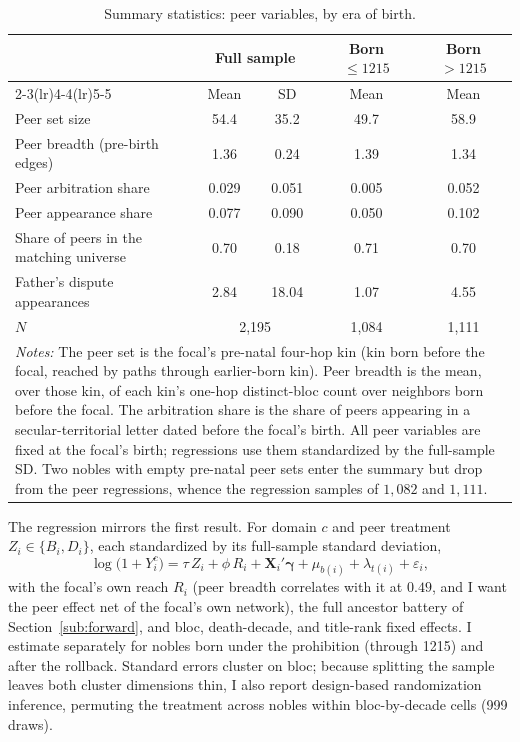 \documentclass[12pt]{article}
\theoremstyle{definition}
\theoremstyle{remark}
\begin{document}
\begin{table}[!t]
\centering
\caption{Summary statistics: peer variables, by era of birth.}
\label{tab:summary_peers}
{\small
\begin{tabular}{lcccc}
\toprule
 & \multicolumn{2}{c}{Full sample} & Born $\leq 1215$ & Born $> 1215$ \\
\cmidrule(lr){2-3}\cmidrule(lr){4-4}\cmidrule(lr){5-5}
 & Mean & SD & Mean & Mean \\
\midrule
Peer set size & 54.4 & 35.2 & 49.7 & 58.9 \\
Peer breadth (pre-birth edges) & 1.36 & 0.24 & 1.39 & 1.34 \\
Peer arbitration share & 0.029 & 0.051 & 0.005 & 0.052 \\
Peer appearance share & 0.077 & 0.090 & 0.050 & 0.102 \\
Share of peers in the matching universe & 0.70 & 0.18 & 0.71 & 0.70 \\
Father's dispute appearances & 2.84 & 18.04 & 1.07 & 4.55 \\
\midrule
$N$ & \multicolumn{2}{c}{2,195} & 1,084 & 1,111 \\
\midrule
\multicolumn{5}{p{0.88\textwidth}}{\footnotesize \textit{Notes:} The peer set is the focal's pre-natal four-hop kin (kin born before the focal, reached by paths through earlier-born kin). Peer breadth is the mean, over those kin, of each kin's one-hop distinct-bloc count over neighbors born before the focal. The arbitration share is the share of peers appearing in a secular-territorial letter dated before the focal's birth. All peer variables are fixed at the focal's birth; regressions use them standardized by the full-sample SD. Two nobles with empty pre-natal peer sets enter the summary but drop from the peer regressions, whence the regression samples of $1{,}082$ and $1{,}111$.} \\
\bottomrule
\end{tabular}
}
\end{table}


The regression mirrors the first result. For domain $c$ and peer treatment $Z_i \in \{B_i, D_i\}$, each standardized by its full-sample standard deviation,
\begin{equation}
\log\!\bigl(1+Y_i^{c}\bigr) = \tau\,Z_{i} + \phi\,R_i
  + \mathbf{X}_i'\boldsymbol{\gamma} + \mu_{b(i)} + \lambda_{t(i)} + \varepsilon_i,
\end{equation}
with the focal's own reach $R_i$ (peer breadth correlates with it at $0.49$, and I want the peer effect net of the focal's own network), the full ancestor battery of Section~\ref{sub:forward}, and bloc, death-decade, and title-rank fixed effects. I estimate separately for nobles born under the prohibition (through 1215) and after the rollback. Standard errors cluster on bloc; because splitting the sample leaves both cluster dimensions thin, I also report design-based randomization inference, permuting the treatment across nobles within bloc-by-decade cells (999 draws).
\end{document}
